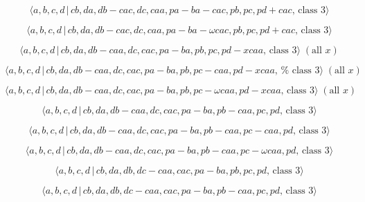\documentclass[10pt]{article}
\begin{document}
\begin{equation}
\langle a,b,c,d\,|\,cb,da,db-cac,dc,caa,pa-ba-cac,pb,pc,pd+cac,\,\text{class 
}3\rangle  \tag{7.3848}
\end{equation}

\begin{equation}
\langle a,b,c,d\,|\,cb,da,db-cac,dc,caa,pa-ba-\omega cac,pb,pc,pd+cac,\,%
\text{class }3\rangle  \tag{7.3849}
\end{equation}

\begin{equation}
\langle a,b,c,d\,|\,cb,da,db-caa,dc,cac,pa-ba,pb,pc,pd-xcaa,\,\text{class }%
3\rangle \;(\text{all }x)  \tag{7.3850}
\end{equation}

\begin{equation}
\langle a,b,c,d\,|\,cb,da,db-caa,dc,cac,pa-ba,pb,pc-caa,pd-xcaa,\,\text{%
class }3\rangle \;(\text{all }x)  \tag{7.3851}
\end{equation}

\begin{equation}
\langle a,b,c,d\,|\,cb,da,db-caa,dc,cac,pa-ba,pb,pc-\omega caa,pd-xcaa,\,%
\text{class }3\rangle \;(\text{all }x)  \tag{7.3852}
\end{equation}

\begin{equation}
\langle a,b,c,d\,|\,cb,da,db-caa,dc,cac,pa-ba,pb-caa,pc,pd,\,\text{class }%
3\rangle  \tag{7.3853}
\end{equation}

\begin{equation}
\langle a,b,c,d\,|\,cb,da,db-caa,dc,cac,pa-ba,pb-caa,pc-caa,pd,\,\text{class 
}3\rangle  \tag{7.3854}
\end{equation}

\begin{equation}
\langle a,b,c,d\,|\,cb,da,db-caa,dc,cac,pa-ba,pb-caa,pc-\omega caa,pd,\,%
\text{class }3\rangle  \tag{7.3855}
\end{equation}

\begin{equation}
\langle a,b,c,d\,|\,cb,da,db,dc-caa,cac,pa-ba,pb,pc,pd,\,\text{class }%
3\rangle  \tag{7.3856}
\end{equation}

\begin{equation}
\langle a,b,c,d\,|\,cb,da,db,dc-caa,cac,pa-ba,pb-caa,pc,pd,\,\text{class }%
3\rangle  \tag{7.3857}
\end{equation}
\end{document}
